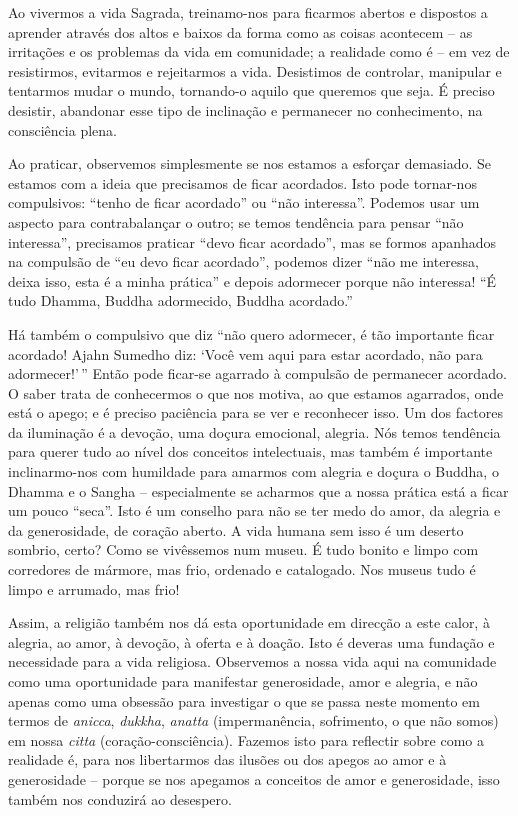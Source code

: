 Ao vivermos a vida Sagrada, treinamo-nos para ficarmos abertos e dispostos a
aprender através dos altos e baixos da forma como as coisas acontecem -- as
irritações e os problemas da vida em comunidade; a realidade como é -- em vez de
resistirmos, evitarmos e rejeitarmos a vida. Desistimos de controlar, manipular
e tentarmos mudar o mundo, tornando-o aquilo que queremos que seja. É preciso
desistir, abandonar esse tipo de inclinação e permanecer no conhecimento, na
consciência plena.

Ao praticar, observemos simplesmente se nos estamos a esforçar demasiado. Se
estamos com a ideia que precisamos de ficar acordados. Isto pode tornar-nos
compulsivos: ``tenho de ficar acordado'' ou ``não interessa''. Podemos usar um
aspecto para contrabalançar o outro; se temos tendência para pensar ``não
interessa'', precisamos praticar ``devo ficar acordado'', mas se formos
apanhados na compulsão de ``eu devo ficar acordado'', podemos dizer ``não me
interessa, deixa isso, esta é a minha prática'' e depois adormecer porque não
interessa! ``É tudo Dhamma, Buddha adormecido, Buddha acordado.''

Há também o compulsivo que diz ``não quero adormecer, é tão importante ficar
acordado! Ajahn Sumedho diz: `Você vem aqui para estar acordado, não para
adormecer!'\,'' Então pode ficar-se agarrado à compulsão de permanecer
acordado. O saber trata de conhecermos o que nos motiva, ao que estamos
agarrados, onde está o apego; e é preciso paciência para se ver e reconhecer
isso. Um dos factores da iluminação é a devoção, uma doçura emocional, alegria.
Nós temos tendência para querer tudo ao nível dos conceitos intelectuais, mas
também é importante inclinarmo-nos com humildade para amarmos com alegria e
doçura o Buddha, o Dhamma e o Sangha -- especialmente se acharmos que a nossa
prática está a ficar um pouco ``seca''. Isto é um conselho para não se ter medo
do amor, da alegria e da generosidade, de coração aberto. A vida humana sem isso
é um deserto sombrio, certo? Como se vivêssemos num museu. É tudo bonito e limpo
com corredores de mármore, mas frio, ordenado e catalogado. Nos museus tudo é
limpo e arrumado, mas frio!

Assim, a religião também nos dá esta oportunidade em direcção a este calor, à
alegria, ao amor, à devoção, à oferta e à doação. Isto é deveras uma fundação e
necessidade para a vida religiosa. Observemos a nossa vida aqui na comunidade
como uma oportunidade para manifestar generosidade, amor e alegria, e não apenas
como uma obsessão para investigar o que se passa neste momento em termos de
\emph{anicca}, \emph{dukkha}, \emph{anatta} (impermanência, sofrimento, o que
não somos) em nossa \emph{citta} (coração-consciência). Fazemos isto para
reflectir sobre como a realidade é, para nos libertarmos das ilusões ou dos
apegos ao amor e à generosidade -- porque se nos apegamos a conceitos de amor e
generosidade, isso também nos conduzirá ao desespero.

